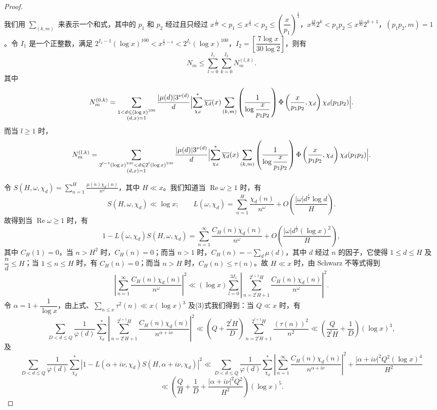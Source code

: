 \begin{proof}
\[\]
我们用 $\displaystyle\sum_{(k,m)}$ 来表示一个和式，其中的 $p_1$ 和 $p_2$ 经过且只经过 $x^{\frac1{10}}<p_1\leqslant x^{\frac13}<p_2\leqslant\left(\dfrac{x}{p_1}\right)^{\frac12}$，$x^{\frac{13}{30}}2^k<p_1p_2\leqslant x^{\frac{13}{30}}2^{k+1}$，$(p_1p_2,m)=1$。令 $I_1$ 是一个正整数，满足 $2^{I_1-1}(\log x)^{100}<x^{\frac12-\epsilon}<2^{I_1}(\log x)^{100}$，$I_2=\left[\dfrac{7\log x}{30\log2}\right]$，则有
\begin{equation}\label{eq:chen13}
N_m\leqslant\sum_{l=0}^{I_1}\sum_{k=0}^{I_2}N_m^{(l,k)}.
\end{equation}
其中
\[
N_m^{(0,k)}=\sum_{\substack{1<d\leqslant(\log x)^{100}\\(d,x)=1}}\frac{|\mu(d)|3^{\nu(d)}}{d}
\Bigl|\sum_{\chi_d}^{*}\overline{\chi_d}(x)\sum_{(k,m)}\left(\frac1{\log\dfrac{x}{p_1p_2}}\right)\Phi\left(\frac{x}{p_1p_2},\chi_d\right)\chi_d(p_1p_2)\Bigr|.
\]
而当 $l\geqslant1$ 时，
\[
N_m^{(l,k)}=\sum_{\substack{2^{l-1}(\log x)^{100}<d\leqslant2^l(\log x)^{100}\\(d,x)=1}}\frac{|\mu(d)|3^{\nu(d)}}{d}
\Bigl|\sum_{\chi_d}^{*}\overline{\chi_d}(x)\sum_{(k,m)}\left(\frac1{\log\dfrac{x}{p_1p_2}}\right)\Phi\left(\frac{x}{p_1p_2},\chi_d\right)\chi_d(p_1p_2)\Bigr|.
\]

令 $S(H,\omega,\chi_d)=\displaystyle\sum_{n=1}^{H}\frac{\mu(n)\chi_d(n)}{n^\omega}$，其中 $H\ll x$。我们知道当 $\operatorname{Re}\omega\geqslant1$ 时，有
\[
S(H,\omega,\chi_d)\ll\log x;\qquad L(\omega,\chi_d)=\sum_{n=1}^{H}\frac{\chi_d(n)}{n^\omega}+O\left(\frac{|\omega|d^{\frac12}\log d}{H}\right).
\]
故得到当 $\operatorname{Re}\omega\geqslant1$ 时，有
\[
1-L(\omega,\chi_d)S(H,\omega,\chi_d)=\sum_{n=1}^{\infty}\frac{C_H(n)\chi_d(n)}{n^\omega}+O\left(\frac{|\omega|d^{\frac12}(\log x)^2}{H}\right),
\]
其中 $C_H(1)=0$，当 $n>H^2$ 时，$C_H(n)=0$；而当 $n>1$ 时，$C_H(n)=-\displaystyle\sum_{d}\mu(d)$，其中 $d$ 经过 $n$ 的因子，它使得 $1\leqslant d\leqslant H$ 及 $\dfrac{n}{d}\leqslant H$；当 $1\leqslant n\leqslant H$ 时，有 $C_H(n)=0$；而当 $n>H$ 时，$C_H(n)\leqslant\tau(n)$。故 $H\ll x$ 时，由 Schwarz 不等式得到
\[
\left|\sum_{n=1}^{\infty}\frac{C_H(n)\chi_d(n)}{n^\omega}\right|^2\ll(\log x)\sum_{l=0}^{3I_1}\left|\sum_{n=2^lH+1}^{2^{l+1}H}\frac{C_H(n)\chi_d(n)}{n^\omega}\right|^2.
\]
令 $\alpha=1+\dfrac1{\log x}$，由上式、$\displaystyle\sum_{n\leqslant x}\tau^2(n)\ll x(\log x)^3$ 及(3)式我们得到：当 $Q\ll x$ 时，有
\[
\sum_{D<d\leqslant Q}\frac1{\varphi(d)}\sum_{\chi_d}^{*}\left|\sum_{n=2^lH+1}^{2^{l+1}H}\frac{C_H(n)\chi_d(n)}{n^{\alpha+i\nu}}\right|^2
\ll\left(Q+\frac{2^lH}{D}\right)\sum_{n=2^lH+1}^{2^{l+1}H}\frac{(\tau(n))^2}{n^2}\ll\left(\frac{Q}{2^lH}+\frac1D\right)(\log x)^3,
\]
及
\[
\sum_{D<d\leqslant Q}\frac1{\varphi(d)}\sum_{\chi_d}^{*}|1-L(\alpha+i\nu,\chi_d)S(H,\alpha+i\nu,\chi_d)|^2
\ll\sum_{D<d\leqslant Q}\frac1{\varphi(d)}\sum_{\chi_d}^{*}\left|\sum_{n=1}^{\infty}\frac{C_H(n)\chi_d(n)}{n^{\alpha+i\nu}}\right|^2+\frac{|\alpha+i\nu|^2Q^2(\log x)^4}{H^2}
\]
\begin{equation}\label{eq:chen14}
\ll\left(\frac{Q}{H}+\frac1D+\frac{|\alpha+i\nu|^2Q^2}{H^2}\right)(\log x)^5.
\end{equation}


\end{proof}
